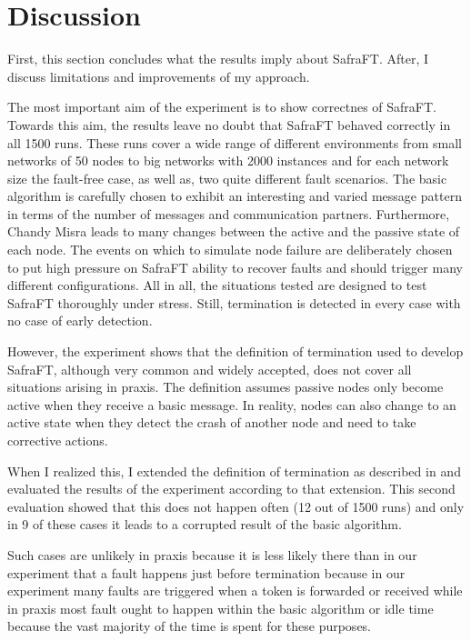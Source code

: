 \section{Discussion}
First, this section concludes what the results imply about SafraFT. After, I discuss limitations and improvements of my approach.

The most important aim of the experiment is to show correctnes of SafraFT.
Towards this aim, the results leave no doubt that SafraFT behaved correctly in all 1500
runs.
These runs cover a wide range of different environments from small networks of 50 nodes to big networks with 2000 instances and for each network size the fault-free case, as well as, two quite different fault scenarios.
The basic algorithm is carefully chosen to exhibit an interesting and varied message pattern in terms of the number of messages and communication partners.
Furthermore, Chandy Misra leads to many changes between the active and the passive state of each node.
The events on which to simulate node failure are deliberately chosen to put high pressure on SafraFT ability to recover faults and should trigger many different configurations.
All in all, the situations tested are designed to test SafraFT thoroughly under stress.
Still, termination is detected in every case with no case of early detection.

However, the experiment shows that the definition of termination used to develop SafraFT, although very common and widely accepted, does not cover all situations arising in praxis.
The definition assumes passive nodes only become active when they receive a basic message.
In reality, nodes can also change to an active state when they detect the crash of another node and need to take corrective actions.

When I realized this, I extended the definition of termination as described in \label{extended-definition} and evaluated the results of the experiment according to that extension.
This second evaluation showed that this does not happen often (12 out of 1500 runs) and only in 9 of these cases it leads to a corrupted result of the basic algorithm.

Such cases are unlikely in praxis because it is less likely there than in our experiment that a fault happens just before termination because in our experiment many faults are triggered when a token is forwarded or received while in praxis most fault ought to happen within the basic algorithm or idle time because the vast majority of the time is spent for these purposes.

